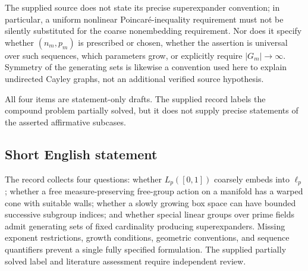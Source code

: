 \documentclass[11pt]{article}
\begin{document}
\begin{enumerate}
The supplied source does not state its precise superexpander convention; in particular, a uniform nonlinear Poincar\'e-inequality requirement must not be silently substituted for the coarse nonembedding requirement. Nor does it specify whether \((n_m,p_m)\) is prescribed or chosen, whether the assertion is universal over such sequences, which parameters grow, or explicitly require \(|G_m|\to\infty\). Symmetry of the generating sets is likewise a convention used here to explain undirected Cayley graphs, not an additional verified source hypothesis.
\end{enumerate}

All four items are statement-only drafts. The supplied record labels the compound problem partially solved, but it does not supply precise statements of the asserted affirmative subcases.
\subsection{Short English statement}
The record collects four questions: whether \(L_p([0,1])\) coarsely embeds into \(\ell_p\); whether a free measure-preserving free-group action on a manifold has a warped cone with suitable walls; whether a slowly growing box space can have bounded successive subgroup indices; and whether special linear groups over prime fields admit generating sets of fixed cardinality producing superexpanders. Missing exponent restrictions, growth conditions, geometric conventions, and sequence quantifiers prevent a single fully specified formulation. The supplied partially solved label and literature assessment require independent review.
\end{document}
